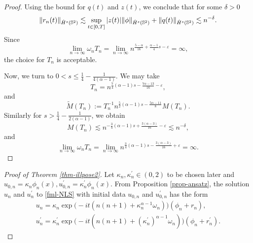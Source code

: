 \documentclass[11pt, reqno]{amsart}
\numberwithin{equation}{section}
\theoremstyle{definition}
\theoremstyle{remark}
\begin{document}
{\begin{proof}
Using the bound for $q(t)$ and $z(t)$, we conclude that for some $\delta>0$
\begin{equation*}
\|r_n(t)\|_{\dot{H}^s(\Bbb S^2)} \lesssim \sup_{t\in[0,T]}|z(t)|\|\phi\|_{\dot{H}^s(\Bbb S^2)} + \|q(t)\|_{\dot{H}^s(\Bbb S^2)} \lesssim n^{-\delta}.
\end{equation*}
Since 
\begin{equation*}
\lim\limits_{n\to\infty}\omega_n T_n = \lim\limits_{n\to\infty}n^{\frac{5-\alpha}{16}+\frac{\alpha-1}{4}s-\varepsilon} =\infty,
\end{equation*}
the choice for $T_n$ is acceptable.
		
Now, we turn to $0<s\le \frac{1}{4}-\frac{1}{4(\alpha-1)}$. We may take
\begin{equation*}
T_n = n^{\frac{7}{4}(\alpha-1)s-\frac{7\alpha-13}{16}-\varepsilon},
\end{equation*}
and 
\begin{equation*}
\widetilde{M}(T_n) := T_n^{-1}n^{\frac{5}{2}(\alpha-1)s-\frac{5\alpha-11}{8}} M(T_n).
\end{equation*}
Similarly for $s>\frac{1}{4}-\frac{1}{2(\alpha-1)}$, we obtain
\begin{equation*}
M(T_n)\lesssim n^{-\frac{3}{4}(\alpha-1)s+\frac{3(\alpha-3)}{16}-\varepsilon} \lesssim n^{-\delta},
\end{equation*}
and
\begin{equation*}
\lim\limits_{n\to\infty}\omega_n T_n = \lim\limits_{n\to\infty}n^{\frac{3}{4}(\alpha-1)s-\frac{3(\alpha-3)}{16}+\varepsilon} =\infty.
\end{equation*}
\end{proof}
	
\begin{proof}[Proof of Theorem \ref{thm-illpose2}]
Let $\kappa_n,\kappa_n^\prime\in (0,2)$ to be chosen later and $u_{0,n} = \kappa_n\phi_n(x),u^\prime_{0,n} = \kappa_n^\prime\phi_n(x)$. From Proposition \ref{prop-ansatz}, the solution $u_n$ and $u_n^\prime$ to \eqref{fml-NLS} with initial data $u_{0,n}$ and $u_{0,n}^\prime$ has the form
\begin{equation*}
\begin{aligned}
u_n = \kappa_n\exp\big(-it(n(n+1)+\kappa_n^{\alpha-1}\omega_n)\big) (\phi_n+r_n),\\
u^\prime_n = \kappa^\prime_n\exp\big(-it(n(n+1)+(\kappa^\prime_n)^{\alpha-1}\omega_n)\big) (\phi_n+r^\prime_n).
\end{aligned}
\end{equation*}
		

\end{proof}}
\end{document}

